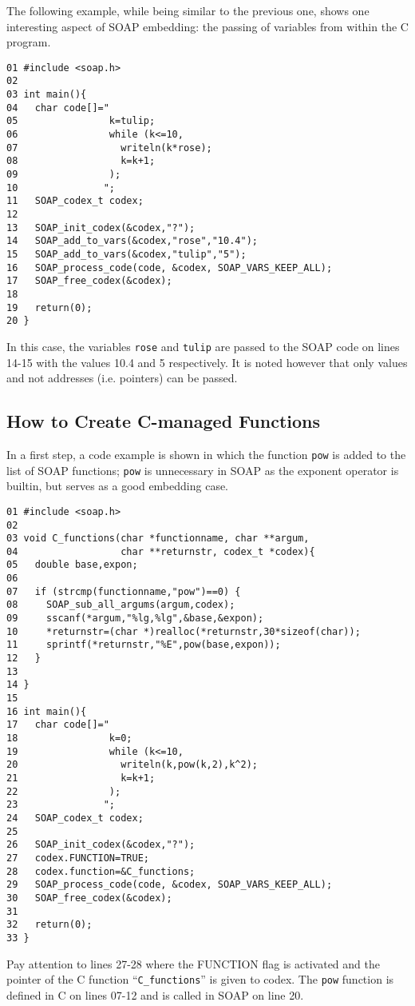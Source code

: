\documentclass{warpdoc}
\begin{document}
The following example, while being similar to the previous one, shows
one interesting aspect of SOAP embedding: the passing of variables from
within the C program.
%
\begin{verbatim}
01 #include <soap.h>
02
03 int main(){
04   char code[]="
05                k=tulip;
06                while (k<=10,
07                  writeln(k*rose);
08                  k=k+1;
09                );
10               ";
11   SOAP_codex_t codex;
12
13   SOAP_init_codex(&codex,"?");
14   SOAP_add_to_vars(&codex,"rose","10.4");
15   SOAP_add_to_vars(&codex,"tulip","5");
16   SOAP_process_code(code, &codex, SOAP_VARS_KEEP_ALL);
17   SOAP_free_codex(&codex);
18
19   return(0);
20 }
\end{verbatim}
%
In this case, the variables \verb|rose| and
\verb|tulip| are passed to the SOAP code on lines 14-15 with the values 10.4 and 5
respectively. It is noted however that only values and not addresses
(i.e. pointers) can be passed.





\subsection{How to Create C-managed Functions}

In a first step, a code example is shown in which the function
\verb|pow| is added to the list of SOAP functions; \verb|pow| is unnecessary
in SOAP as the exponent operator is builtin, but serves as a good embedding case.
%
\begin{verbatim}
01 #include <soap.h>
02
03 void C_functions(char *functionname, char **argum,
04                  char **returnstr, codex_t *codex){
05   double base,expon;
06
07   if (strcmp(functionname,"pow")==0) {
08     SOAP_sub_all_argums(argum,codex);
09     sscanf(*argum,"%lg,%lg",&base,&expon);
10     *returnstr=(char *)realloc(*returnstr,30*sizeof(char));
11     sprintf(*returnstr,"%E",pow(base,expon));
12   }
13
14 }
15
16 int main(){
17   char code[]="
18                k=0;
19                while (k<=10,
20                  writeln(k,pow(k,2),k^2);
21                  k=k+1;
22                );
23               ";
24   SOAP_codex_t codex;
25
26   SOAP_init_codex(&codex,"?");
27   codex.FUNCTION=TRUE;
28   codex.function=&C_functions;
29   SOAP_process_code(code, &codex, SOAP_VARS_KEEP_ALL);
30   SOAP_free_codex(&codex);
31
32   return(0);
33 }
\end{verbatim}
%
Pay attention to lines 27-28 where the FUNCTION flag is activated and the pointer
of the C function ``\verb|C_functions|'' is given to codex. The \verb|pow|
function is defined in C on lines 07-12 and is called in SOAP on line
20.
\end{document}
